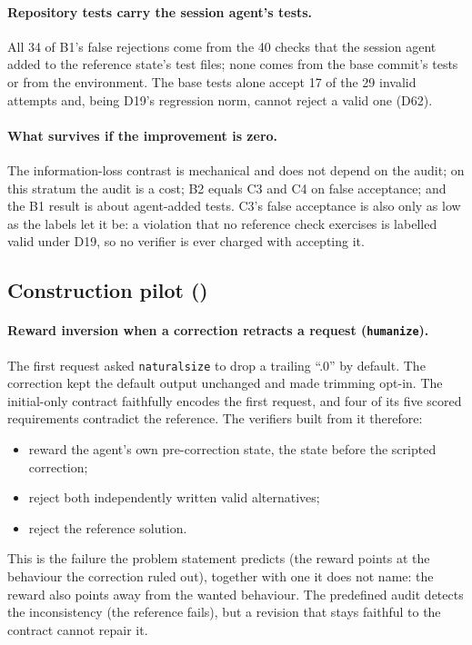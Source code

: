 \paragraph{Repository tests carry the session agent's tests.} All 34 of B1's false rejections come from the 40 checks that the session agent added to the reference state's test files; none comes from the base commit's tests or from the environment. The base tests alone accept 17 of the 29 invalid attempts and, being D19's regression norm, cannot reject a valid one (D62).

\paragraph{What survives if the improvement is zero.} The information-loss contrast is mechanical and does not depend on the audit; on this stratum the audit is a cost; B2 equals C3 and C4 on false acceptance; and the B1 result is about agent-added tests. C3's false acceptance is also only as low as the labels let it be: a violation that no reference check exercises is labelled valid under D19, so no verifier is ever charged with accepting it.

\subsection{Construction pilot (\texttt{\PILOTRUN})}
\label{sec:analysis-pilot}
\paragraph{Reward inversion when a correction retracts a request (\texttt{humanize}).} The first request asked \texttt{naturalsize} to drop a trailing ``.0'' by default. The correction kept the default output unchanged and made trimming opt-in. The initial-only contract faithfully encodes the first request, and four of its five scored requirements contradict the reference. The verifiers built from it therefore:
\begin{itemize}
\item reward the agent's own pre-correction state, the state before the scripted correction;
\item reject both independently written valid alternatives;
\item reject the reference solution.
\end{itemize}
This is the failure the problem statement predicts (the reward points at the behaviour the correction ruled out), together with one it does not name: the reward also points away from the wanted behaviour. The predefined audit detects the inconsistency (the reference fails), but a revision that stays faithful to the contract cannot repair it.

